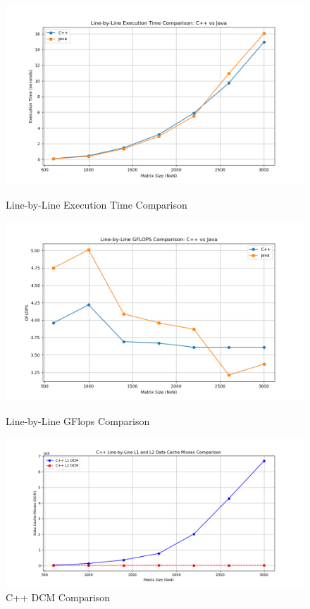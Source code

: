 \documentclass{article}
\begin{document}
\begin{figure}[H]
    \centering
    \begin{minipage}{0.32\textwidth}
        \centering
        \includegraphics[width=\textwidth]{Figure_4.png}
        \caption{\small Line-by-Line Execution Time Comparison}
        \label{fig:execution_time_linebyline}
    \end{minipage}
    \hfill
    \begin{minipage}{0.32\textwidth}
        \centering
        \includegraphics[width=\textwidth]{Figure_5.png}
        \caption{\small Line-by-Line GFlops Comparison}
        \label{fig:flops_linebyline}
    \end{minipage}
    \hfill
    \begin{minipage}{0.32\textwidth}
        \centering
        \includegraphics[width=\textwidth]{Figure_6.png}
        \caption{\small C++ DCM Comparison}
        \label{fig:cache_misses_linebyline}
    \end{minipage}
\end{figure}
\end{document}
